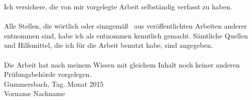
Ich versichere, die von mir vorgelegte Arbeit selbständig verfasst zu haben.\\ \\
Alle Stellen, die wörtlich oder sinngemäß \ aus veröffentlichten Arbeiten anderer entnommen sind, habe ich als entnommen kenntlich gemacht. Sämtliche Quellen und Hilfsmittel, die ich für die Arbeit benutzt habe, sind angegeben.\\ \\
Die Arbeit hat nach meinem Wissen mit gleichem Inhalt noch keiner anderen Prüfungsbehörde vorgelegen.
\vspace{1.5cm}
\\
Gummersbach, Tag. Monat 2015
\vspace{2cm}
\\
Vorname Nachname